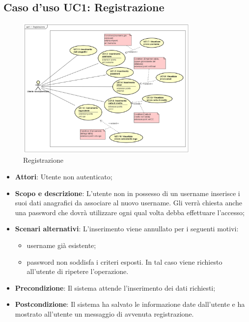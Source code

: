 \documentclass[12pt,a4paper,titlepage]{article}
\begin{document}
	\subsection{Caso d'uso UC1: Registrazione}
	\label{UC1}
	\begin{figure}[ht]
		\centering
		\includegraphics[width=0.8\textwidth]{UseCase/Registrazione}
		\caption{Registrazione}
	\end{figure}
	\begin{itemize}
		\item \textbf{Attori}: Utente non autenticato;
		\item \textbf{Scopo e descrizione}: L'utente non in possesso di un username inserisce i suoi dati anagrafici da associare al nuovo username. Gli verrà chiesta anche una password che dovrà utilizzare ogni qual volta debba effettuare l'accesso;
		\item \textbf{Scenari alternativi}: L'inserimento viene annullato per i seguenti motivi:
		\begin{itemize}
			\item username già esistente;
			\item password non soddisfa i criteri esposti. In tal caso viene richiesto all'utente di ripetere l'operazione.
		\end{itemize}
		\item \textbf{Precondizione}: Il sistema attende l'inserimento dei dati richiesti;
		\item \textbf{Postcondizione}: Il sistema ha salvato le informazione date dall'utente e ha mostrato all'utente un messaggio di avvenuta registrazione.
	\end{itemize}
\end{document}
